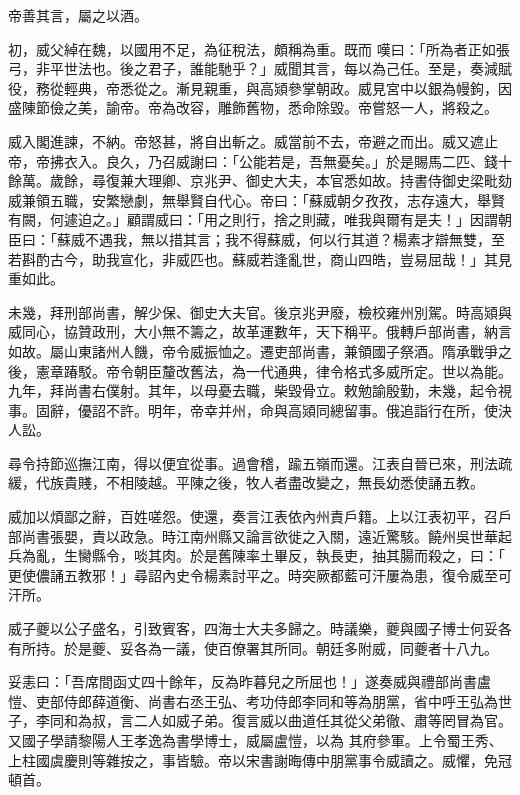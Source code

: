 \begin{pinyinscope}
 帝善其言，屬之以酒。



 初，威父綽在魏，以國用不足，為征稅法，頗稱為重。既而
 嘆曰：「所為者正如張弓，非平世法也。後之君子，誰能馳乎？」威聞其言，每以為己任。至是，奏減賦役，務從輕典，帝悉從之。漸見親重，與高熲參掌朝政。威見宮中以銀為幔鉤，因盛陳節儉之美，諭帝。帝為改容，雕飾舊物，悉命除毀。帝嘗怒一人，將殺之。



 威入閣進諫，不納。帝怒甚，將自出斬之。威當前不去，帝避之而出。威又遮止帝，帝拂衣入。良久，乃召威謝曰：「公能若是，吾無憂矣。」於是賜馬二匹、錢十餘萬。歲餘，尋復兼大理卿、京兆尹、御史大夫，本官悉如故。持書侍御史梁毗劾威兼領五職，安繁戀劇，無舉賢自代心。帝曰：「蘇威朝夕孜孜，志存遠大，舉賢
 有闕，何遽迫之。」顧謂威曰：「用之則行，捨之則藏，唯我與爾有是夫！」因謂朝臣曰：「蘇威不遇我，無以措其言；我不得蘇威，何以行其道？楊素才辯無雙，至若斟酌古今，助我宣化，非威匹也。蘇威若逢亂世，商山四皓，豈易屈哉！」其見重如此。



 未幾，拜刑部尚書，解少保、御史大夫官。後京兆尹廢，檢校雍州別駕。時高熲與威同心，協贊政刑，大小無不籌之，故革運數年，天下稱平。俄轉戶部尚書，納言如故。屬山東諸州人饑，帝令威振恤之。遷吏部尚書，兼領國子祭酒。隋承戰爭之後，憲章踳駁。帝令朝臣釐改舊法，為一代通典，律令格式多威所定。世以為能。
 九年，拜尚書右僕射。其年，以母憂去職，柴毀骨立。敕勉諭殷勤，未幾，起令視事。固辭，優詔不許。明年，帝幸并州，命與高熲同總留事。俄追詣行在所，使決人訟。



 尋令持節巡撫江南，得以便宜從事。過會稽，踰五嶺而還。江表自晉已來，刑法疏緩，代族貴賤，不相陵越。平陳之後，牧人者盡改變之，無長幼悉使誦五教。



 威加以煩鄙之辭，百姓嗟怨。使還，奏言江表依內州責戶籍。上以江表初平，召戶部尚書張嬰，責以政急。時江南州縣又論言欲徙之入關，遠近驚駭。饒州吳世華起兵為亂，生臠縣令，啖其肉。於是舊陳率土畢反，執長吏，抽其腸而殺之，曰：「
 更使儂誦五教邪！」尋詔內史令楊素討平之。時突厥都藍可汗屢為患，復令威至可汗所。



 威子夔以公子盛名，引致賓客，四海士大夫多歸之。時議樂，夔與國子博士何妥各有所持。於是夔、妥各為一議，使百僚署其所同。朝廷多附威，同夔者十八九。



 妥恚曰：「吾席間函丈四十餘年，反為昨暮兒之所屈也！」遂奏威與禮部尚書盧愷、吏部侍郎薛道衡、尚書右丞王弘、考功侍郎李同和等為朋黨，省中呼王弘為世子，李同和為叔，言二人如威子弟。復言威以曲道任其從父弟徹、肅等罔冒為官。又國子學請黎陽人王孝逸為書學博士，威屬盧愷，以為
 其府參軍。上令蜀王秀、上柱國虞慶則等雜按之，事皆驗。帝以宋書謝晦傳中朋黨事令威讀之。威懼，免冠頓首。




\end{pinyinscope}
